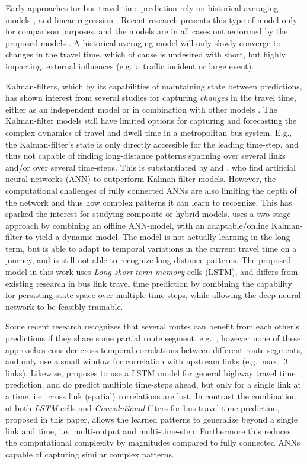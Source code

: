 \documentclass[preprint,11pt,5p,twocolumn]{elsarticle}
\begin{document}
Early approaches for bus travel time prediction rely on historical averaging models \cite{Dailey1999,Sun2007}, and linear regression \cite{Patnaik2004}. Recent research presents this type of model only for comparison purposes, and the models are in all cases outperformed by the proposed models \cite{Shalaby2004,Jeong2005}. A historical averaging model will only slowly converge to changes in the travel time, which of cause is undesired with short, but highly impacting, external influences (e.g.\ a traffic incident or large event). 

Kalman-filters, which by its capabilities of maintaining state between predictions, has shown interest from several studies for capturing \emph{changes} in the travel time, either as an independent model \cite{Chen2001,Shalaby2004} or in combination with other models \cite{Yo2010,Bai2015}. The Kalman-filter models still have limited options for capturing and forecasting the complex dynamics of travel and dwell time in a metropolitan bus system. E.g., the Kalman-filter's state is only directly accessible for the leading time-step, and thus not capable of finding long-distance patterns spanning over several links and/or over several time-steps. This is substantiated by \cite{Lin2013} and \cite{Kumar2014}, who find artificial neural networks (ANN) to outperform Kalman-filter models. However, the computational challenges of fully connected ANNs are also limiting the depth of the network and thus how complex patterns it can learn to recognize. This has sparked the interest for studying composite or hybrid models. \citet{Bai2015} uses a two-stage approach by combining an offline ANN-model, with an adaptable/online Kalman-filter to yield a dynamic model. The model is not actually learning in the long term, but is able to adapt to temporal variations in the current travel time on a journey, and is still not able to recognize long distance patterns. The proposed model in this work uses \emph{Long short-term memory} cells (LSTM), and differs from existing research in bus link travel time prediction by combining the capability for persisting state-space over multiple time-steps, while allowing the deep neural network to be feasibly trainable.

Some recent research recognizes that several routes can benefit from each other's predictions if they share some partial route segment, e.g.\ \cite{Yu2011,Gal2014,Bai2015}, however none of these approaches consider cross temporal correlations between different route segments, and only use a small window for correlation with upstream links (e.g.\ max.\ 3 links). Likewise, \citet{YanjieDuan2016} proposes to use a LSTM model for general highway travel time prediction, and do predict multiple time-steps ahead, but only for a single link at a time, i.e.\ cross link (spatial) correlations are lost. In contrast the combination of both \emph{LSTM} cells and \emph{Convolutional} filters for bus travel time prediction, proposed in this paper, allows the learned patterns to generalize beyond a single link and time, i.e.\ multi-output and multi-time-step. Furthermore this reduces the computational complexity by magnitudes compared to fully connected ANNs capable of capturing similar complex patterns.
\end{document}
